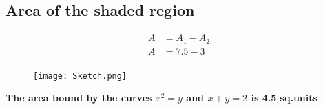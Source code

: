 \subsection{\textbf{Area of the shaded region}}
\begin{align}
    A &= A_1 - A_2\\
    A &= 7.5 - 3\\
\end{align}
\begin{center}
    \textbf{}
\end{center}
\begin{figure}[H]
    \centering
    \texttt{[image: Sketch.png]}
\end{figure}
\begin{center}
\textbf{The area bound by the curves $x^2 = y$ and $x + y = 2$ is 4.5 sq.units}
\end{center}


